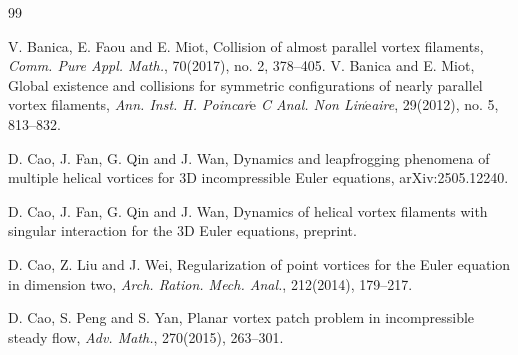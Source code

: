 \documentclass[12pt,reqno]{amsart}
\numberwithin{equation}{section}
\theoremstyle{definition}
\theoremstyle{remark}
\begin{document}
\begin{thebibliography}{99}

%
%
%
V. Banica, E. Faou and E. Miot, Collision of almost parallel vortex filaments, \textit{Comm. Pure Appl. Math.}, 70(2017), no. 2, 378--405.
V. Banica  and E. Miot, Global existence and collisions for symmetric configurations of nearly parallel vortex filaments, \textit{Ann. Inst. H. Poincar$\acute{\text{e}}$ C Anal. Non Lin$\acute{\text{e}}$aire}, 29(2012), no. 5, 813--832.






D. Cao, J. Fan, G. Qin and J. Wan, Dynamics and leapfrogging phenomena of multiple helical vortices for  3D incompressible Euler equations, arXiv:2505.12240.

D. Cao, J. Fan, G. Qin and J. Wan, Dynamics of helical vortex filaments with singular interaction for the 3D Euler equations, preprint.

D. Cao, Z. Liu and J. Wei, Regularization of point vortices  for the
Euler equation in dimension two, \textit{Arch. Ration. Mech. Anal.},
212(2014), 179--217.

%
D. Cao, S. Peng and S. Yan, Planar vortex patch problem in incompressible steady flow,  \textit{Adv. Math.}, 270(2015), 263--301.


\end{thebibliography}
\end{document}
